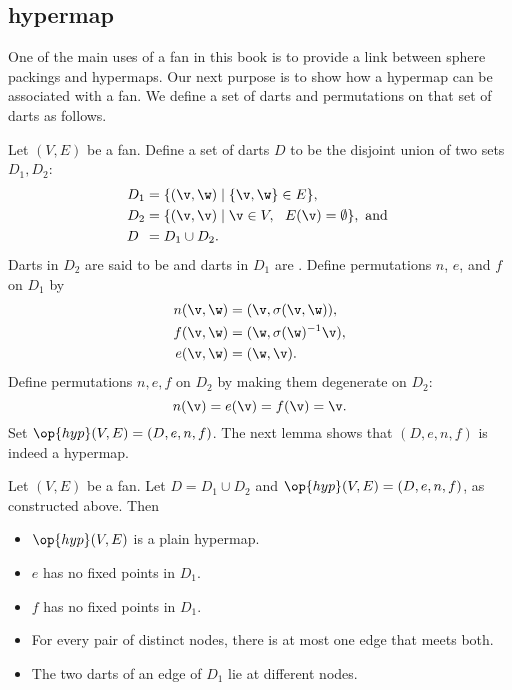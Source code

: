 \subsection{hypermap}
One of the main uses of a fan in this book is to provide a link between sphere
packings and hypermaps.  Our next purpose is to show how a hypermap can be associated
with a fan.   We define a set of darts and permutations on that set of darts as follows.

Let $(V,E)$ be a fan.  Define a set of darts $D$ to be the disjoint union of
two sets $D_1,D_2$:
\begin{align*}
D_1 &= \{(\v,\w)\mid \{\v,\w\}\in E\},\\
D_2 &= \{(\v,\v) \mid \v\in V,\ \ E(\v) = \emptyset\},\text{ and }\\
D\phantom{_2}   &= D_1\cup D_2.
\end{align*}
Darts in $D_2$ are said to be  and darts in
$D_1$ are .
%
%
%
%
%
%
%
Define permutations $n$, $e$, and $f$ on $D_1$ by
\begin{align*}n(\v,\w) &= (\v,\sigma(\v,\w)),\\
f (\v,\w) &= (\w,\sigma(\w)^{-1} \v),\\
e (\v,\w) &= (\w,\v).
\end{align*}
Define permutations $n,e,f$ on $D_2$ by making them degenerate on $D_2$:
\begin{displaymath}
n (\v) = e(\v) = f(\v) = \v.
\end{displaymath}
Set %
$\op{hyp}(V,E)=(D,e,n,f)$. %
The next lemma shows that $(D,e,n,f)$ is indeed a hypermap.



\begin{lemma}[]\label{lemma:fan-plain}
Let $(V,E)$ be a fan.  Let $D = D_1\cup D_2$
and $\op{hyp}(V,E) = (D,e,n,f)$, as constructed above.  Then
\begin{itemize}
\item $\op{hyp}(V,E)$ is a plain hypermap.
\item  $e$ has no fixed
points in $D_1$.
\item  $f$ has no fixed points in $D_1$.
\item For every pair of distinct nodes, there is at most one
edge that meets both.
\item The two darts of an edge of $D_1$ lie at different nodes.
\end{itemize}
%
\end{lemma}


